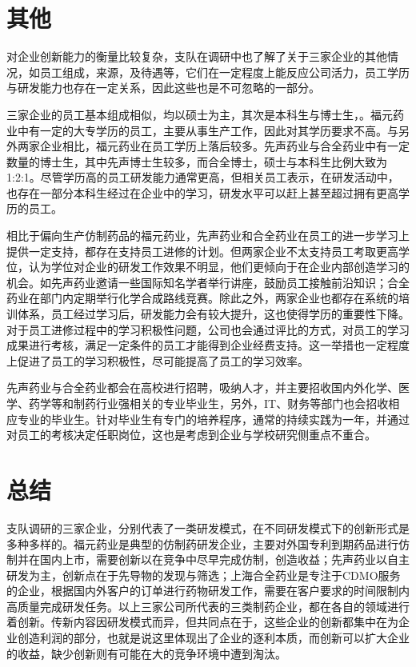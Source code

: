\documentclass[twocolumn,openany]{ctexbook}
\begin{document}
			\section{其他}
			对企业创新能力的衡量比较复杂，支队在调研中也了解了关于三家企业的其他情况，如员工组成，来源，及待遇等，它们在一定程度上能反应公司活力，员工学历与研发能力也存在一定关系，因此这些也是不可忽略的一部分。
			
			三家企业的员工基本组成相似，均以硕士为主，其次是本科生与博士生，。福元药业中有一定的大专学历的员工，主要从事生产工作，因此对其学历要求不高。与另外两家企业相比，福元药业在员工学历上落后较多。先声药业与合全药业中有一定数量的博士生，其中先声博士生较多，而合全博士，硕士与本科生比例大致为1:2:1。尽管学历高的员工研发能力通常更高，但相关员工表示，在研发活动中，也存在一部分本科生经过在企业中的学习，研发水平可以赶上甚至超过拥有更高学历的员工。
			
			相比于偏向生产仿制药品的福元药业，先声药业和合全药业在员工的进一步学习上提供一定支持，都存在支持员工进修的计划。但两家企业不太支持员工考取更高学位，认为学位对企业的研发工作效果不明显，他们更倾向于在企业内部创造学习的机会。如先声药业邀请一些国际知名学者举行讲座，鼓励员工接触前沿知识；合全药业在部门内定期举行化学合成路线竞赛。除此之外，两家企业也都存在系统的培训体系，员工经过学习后，研发能力会有较大提升，这也使得学历的重要性下降。对于员工进修过程中的学习积极性问题，公司也会通过评比的方式，对员工的学习成果进行考核，满足一定条件的员工才能得到企业经费支持。这一举措也一定程度上促进了员工的学习积极性，尽可能提高了员工的学习效率。
			
			先声药业与合全药业都会在高校进行招聘，吸纳人才，并主要招收国内外化学、医学、药学等和制药行业强相关的专业毕业生，另外，IT、财务等部门也会招收相应专业的毕业生。针对毕业生有专门的培养程序，通常的持续实践为一年，并通过对员工的考核决定任职岗位，这也是考虑到企业与学校研究侧重点不重合。
			
	
	
\section{总结}
	支队调研的三家企业，分别代表了一类研发模式，在不同研发模式下的创新形式是多种多样的。福元药业是典型的仿制药研发企业，主要对外国专利到期药品进行仿制并在国内上市，需要创新以在竞争中尽早完成仿制，创造收益；先声药业以自主研发为主，创新点在于先导物的发现与筛选；上海合全药业是专注于CDMO服务的企业，根据国内外客户的订单进行药物研发工作，需要在客户要求的时间限制内高质量完成研发任务。以上三家公司所代表的三类制药企业，都在各自的领域进行着创新。传新内容因研发模式而异，但共同点在于，这些企业的创新都集中在为企业创造利润的部分，也就是说这里体现出了企业的逐利本质，而创新可以扩大企业的收益，缺少创新则有可能在大的竞争环境中遭到淘汰。
	
\end{document}
